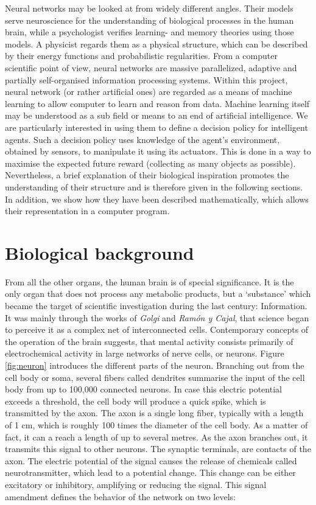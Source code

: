 \documentclass[10pt,a4paper,DIV=11]{scrreprt}
\begin{document}
Neural networks may be looked at from widely different angles. Their models serve neuroscience for the understanding of biological processes 
in the human brain, while a psychologist verifies learning- and memory theories using those models. A physicist regards them as a physical structure,
which can be described by their energy functions and probabilistic regularities. From a computer scientific point of view, neural networks
are massive parallelized, adaptive and partially self-organised information processing systems. \cite{NNGER}
Within this project, neural network (or rather artificial ones) are regarded as a means of machine learning to allow computer to learn and reason
from data. Machine learning itself may be understood as a sub field or means to an end of artificial intelligence.
We are particularly interested in using them to define a decision policy for intelligent agents. Such a decision policy uses knowledge of the agent's
environment, obtained by sensors, to manipulate it using its actuators. This is done in a way to maximise the expected future reward (collecting as
many objects as possible). Nevertheless, a brief explanation of their biological inspiration promotes the understanding of their structure and is 
therefore given in the following sections. In addition, we show how they have been described mathematically, which allows their representation 
in a computer program.

\section{Biological background}
From all the other organs, the human brain is of special significance. It is the only organ that does not process any metabolic products, but a 
‘substance’ which became the target of scientific investigation during the last century: Information. It was mainly through the works of 
\textit{Golgi} and \textit{Ramón y Cajal}, that science began to perceive it as a complex net of interconnected cells. Contemporary 
concepts of the operation of the brain suggests, that mental activity consists primarily of electrochemical activity in large networks of nerve 
cells, or neurons. Figure \ref{fig:neuron} introduces the different parts of the neuron. Branching out from the cell body or soma, several fibers 
called dendrites summarise the input of the cell body from up to 100,000 connected neurons. In case this electric potential exceeds a threshold, 
the cell body will produce a quick spike, which is transmitted by the axon. The axon is a single long fiber, typically with a length of 1 cm,
which is roughly 100 times the diameter of the cell body. As a matter of fact, it can a reach a length of up to several metres. As the axon branches 
out, it transmits this signal to other neurons. The synaptic terminals, are contacts of the axon. The electric potential of the signal causes the 
release of chemicals called neurotransmitter, which lead to a potential change. This change can be either excitatory or inhibitory, amplifying or 
reducing the signal. This signal amendment defines the behavior of the network on two levels: 
\end{document}
